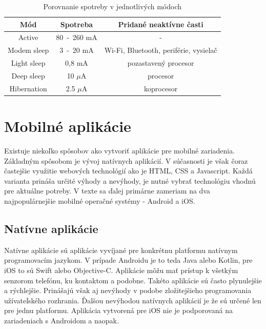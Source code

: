 \begin{table}[ht]
    \centering
    \renewcommand{\arraystretch}{1.5}
    \begin{tabular}{|c|c|c|}
        \hline
        Mód & Spotreba & Pridané neaktívne časti \\ \hline
        Active & 80~-~260 mA\footnotemark[5] & - \\ \hline
        Modem sleep & 3~-~20 mA & Wi-Fi, Bluetooth, periférie, vysielač\\ \hline
        Light sleep & 0,8 mA & pozastavený procesor\\ \hline
        Deep sleep & 10 $\mu$A & procesor\\ \hline
        Hibernation & 2.5 $\mu$A & koprocesor\\ \hline
    \end{tabular}
    \caption[Porovnanie spotreby v jednotlivých módoch]{Porovnanie spotreby v jednotlivých módoch\cite{esp-sleep}}
    \label{tab:spotreba_esp}
\end{table}



\chapter{Mobilné aplikácie}

Existuje niekoľko spôsobov ako vytvoriť aplikácie pre mobilné zariadenia. Základným spôsobom je vývoj natívnych aplikácií. V súčasnosti je však čoraz častejšie využitie webových technológií ako je HTML, CSS a Javascript. Každá varianta prináša určité výhody a nevýhody, je nutné vybrať technológiu vhodnú pre aktuálne potreby. V texte sa ďalej primárne zameriam na dva najpopulárnejšie mobilné operačné systémy - Android a iOS.

\section{Natívne aplikácie}

Natívne aplikácie sú aplikácie vyvíjané pre konkrétnu platformu natívnym programovacím jazykom. V prípade Androidu je to teda Java alebo Kotlin, pre iOS to sú Swift alebo Objective-C. Aplikácie môžu mať prístup k všetkým senzorom telefónu, ku kontaktom a podobne. Takéto aplikácie sú často plynulejšie a rýchlejšie. Prinášajú však aj nevýhody v podobe zložitejšieho programovania užívateľského rozhrania. Ďalšou nevýhodou natívnych aplikácií je že sú určené len pre jednu platformu. Aplikácia vytvorená pre iOS nie je podporovaná na zariadeniach s Androidom a naopak.\cite{hybrid-app}

